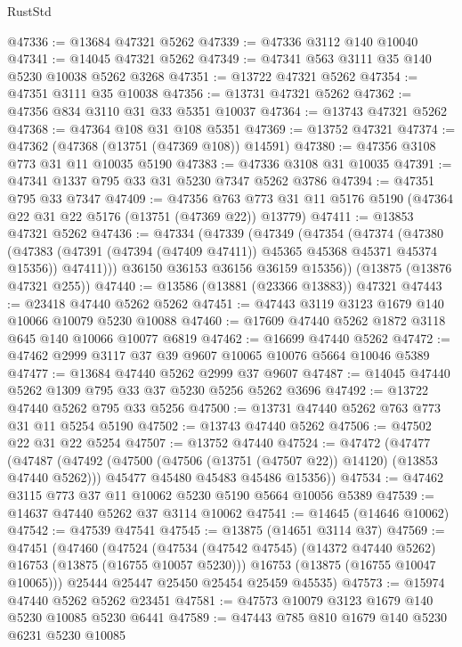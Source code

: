 \begin{lexlean}{RustStd}
\begin{coremodule}
@47336 := @13684 @47321 @5262
@47339 := @47336 @3112 @140 @10040
@47341 := @14045 @47321 @5262
@47349 := @47341 @563 @3111 @35 @140 @5230 @10038 @5262 @3268
@47351 := @13722 @47321 @5262
@47354 := @47351 @3111 @35 @10038
@47356 := @13731 @47321 @5262
@47362 := @47356 @834 @3110 @31 @33 @5351 @10037
@47364 := @13743 @47321 @5262
@47368 := @47364 @108 @31 @108 @5351
@47369 := @13752 @47321
@47374 := @47362 (@47368 (@13751 (@47369 @108)) @14591)
@47380 := @47356 @3108 @773 @31 @11 @10035 @5190
@47383 := @47336 @3108 @31 @10035
@47391 := @47341 @1337 @795 @33 @31 @5230 @7347 @5262 @3786
@47394 := @47351 @795 @33 @7347
@47409 := @47356
    @763
    @773
    @31
    @11
    @5176
    @5190
    (@47364 @22 @31 @22 @5176 (@13751 (@47369 @22)) @13779)
@47411 := @13853 @47321 @5262
@47436 := @47334
    (@47339
      (@47349
        (@47354
          (@47374
            (@47380
              (@47383 (@47391 (@47394 (@47409 @47411)) @45365 @45368 @45371 @45374 @15356))
              @47411)))
        @36150
        @36153
        @36156
        @36159
        @15356))
    (@13875 (@13876 @47321 @255))
@47440 := @13586 (@13881 (@23366 @13883)) @47321
@47443 := @23418 @47440 @5262 @5262
@47451 := @47443 @3119 @3123 @1679 @140 @10066 @10079 @5230 @10088
@47460 := @17609 @47440 @5262 @1872 @3118 @645 @140 @10066 @10077 @6819
@47462 := @16699 @47440 @5262
@47472 := @47462 @2999 @3117 @37 @39 @9607 @10065 @10076 @5664 @10046 @5389
@47477 := @13684 @47440 @5262 @2999 @37 @9607
@47487 := @14045 @47440 @5262 @1309 @795 @33 @37 @5230 @5256 @5262 @3696
@47492 := @13722 @47440 @5262 @795 @33 @5256
@47500 := @13731 @47440 @5262 @763 @773 @31 @11 @5254 @5190
@47502 := @13743 @47440 @5262
@47506 := @47502 @22 @31 @22 @5254
@47507 := @13752 @47440
@47524 := @47472
    (@47477
      (@47487
        (@47492 (@47500 (@47506 (@13751 (@47507 @22)) @14120) (@13853 @47440 @5262)))
        @45477
        @45480
        @45483
        @45486
        @15356))
@47534 := @47462 @3115 @773 @37 @11 @10062 @5230 @5190 @5664 @10056 @5389
@47539 := @14637 @47440 @5262 @37 @3114 @10062
@47541 := @14645 (@14646 @10062)
@47542 := @47539 @47541
@47545 := @13875 (@14651 @3114 @37)
@47569 := @47451
    (@47460
      (@47524
        (@47534 (@47542 @47545) (@14372 @47440 @5262) @16753 (@13875 (@16755 @10057 @5230)))
        @16753
        (@13875 (@16755 @10047 @10065)))
      @25444
      @25447
      @25450
      @25454
      @25459
      @45535)
@47573 := @15974 @47440 @5262 @5262 @23451
@47581 := @47573 @10079 @3123 @1679 @140 @5230 @10085 @5230 @6441
@47589 := @47443 @785 @810 @1679 @140 @5230 @6231 @5230 @10085

\end{coremodule}
\end{lexlean}

